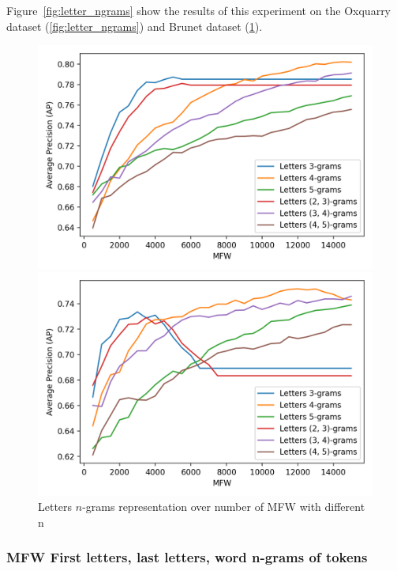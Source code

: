 Figure~\ref{fig:letter_ngrams} show the results of this experiment on the Oxquarry dataset (\ref{fig:letter_ngrams}) and Brunet dataset (\ref{fig:letter_ngrams_brunet}).

\begin{figure}
  \caption{Letters $n$-grams representation over number of MFW with different n}
  \label{fig:letter_ngrams}

  \label{fig:letter_ngrams_oxquarry}
  \includegraphics[width=\linewidth]{img/letter_ngrams_oxquarry.png}

  \label{fig:letter_ngrams_brunet}
  \includegraphics[width=\linewidth]{img/letter_ngrams_brunet.png}
\end{figure}


\subsubsection{MFW First letters, last letters, word n-grams of tokens}

